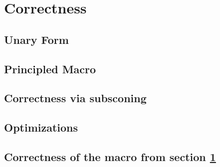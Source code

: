 \section{Correctness}


\subsection{Unary Form} %
\label{sub:unary_form}

\subsection{Principled Macro} %
\label{sub:principled_macro}

\subsection{Correctness via subsconing} %
\label{sub:correctness_via_subsconing}

\subsection{Optimizations} %
\label{sub:optimizations}

\subsection{Correctness of the macro from section \ref{}} %
\label{sub:correctness_of_the_macro_from_section_ref}

